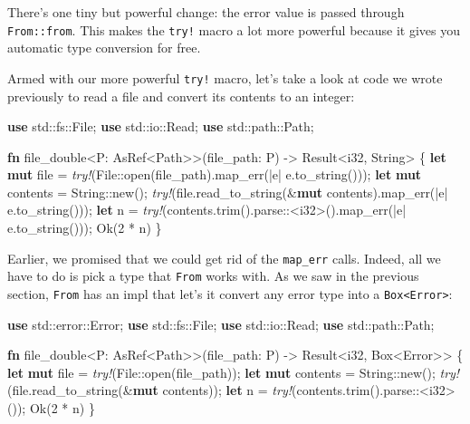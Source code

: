 \documentclass[a4paper,]{book}
\newenvironment{Shaded}{\begin{snugshade}}{\end{snugshade}}
\newcommand{\KeywordTok}[1]{\textcolor[rgb]{0.13,0.29,0.53}{\textbf{{#1}}}}
\newcommand{\DataTypeTok}[1]{\textcolor[rgb]{0.13,0.29,0.53}{{#1}}}
\newcommand{\DecValTok}[1]{\textcolor[rgb]{0.00,0.00,0.81}{{#1}}}
\newcommand{\ConstantTok}[1]{\textcolor[rgb]{0.00,0.00,0.00}{{#1}}}
\newcommand{\PreprocessorTok}[1]{\textcolor[rgb]{0.56,0.35,0.01}{\textit{{#1}}}}
\newcommand{\NormalTok}[1]{{#1}}
\begin{document}
There's one tiny but powerful change: the error value is passed through
\texttt{From::from}. This makes the \texttt{try!} macro a lot more
powerful because it gives you automatic type conversion for free.

Armed with our more powerful \texttt{try!} macro, let's take a look at
code we wrote previously to read a file and convert its contents to an
integer:

\begin{Shaded}
\begin{Highlighting}[]
\KeywordTok{use} \NormalTok{std::fs::File;}
\KeywordTok{use} \NormalTok{std::io::Read;}
\KeywordTok{use} \NormalTok{std::path::Path;}

\KeywordTok{fn} \NormalTok{file_double<P: AsRef<Path>>(file_path: P) -> }\DataTypeTok{Result}\NormalTok{<}\DataTypeTok{i32}\NormalTok{, }\DataTypeTok{String}\NormalTok{> \{}
    \KeywordTok{let} \KeywordTok{mut} \NormalTok{file = }\PreprocessorTok{try!}\NormalTok{(File::open(file_path).map_err(|e| e.to_string()));}
    \KeywordTok{let} \KeywordTok{mut} \NormalTok{contents = }\DataTypeTok{String}\NormalTok{::new();}
    \PreprocessorTok{try!}\NormalTok{(file.read_to_string(&}\KeywordTok{mut} \NormalTok{contents).map_err(|e| e.to_string()));}
    \KeywordTok{let} \NormalTok{n = }\PreprocessorTok{try!}\NormalTok{(contents.trim().parse::<}\DataTypeTok{i32}\NormalTok{>().map_err(|e| e.to_string()));}
    \ConstantTok{Ok}\NormalTok{(}\DecValTok{2} \NormalTok{* n)}
\NormalTok{\}}
\end{Highlighting}
\end{Shaded}

Earlier, we promised that we could get rid of the \texttt{map\_err}
calls. Indeed, all we have to do is pick a type that \texttt{From} works
with. As we saw in the previous section, \texttt{From} has an impl that
let's it convert any error type into a
\texttt{Box\textless{}Error\textgreater{}}:

\begin{Shaded}
\begin{Highlighting}[]
\KeywordTok{use} \NormalTok{std::error::Error;}
\KeywordTok{use} \NormalTok{std::fs::File;}
\KeywordTok{use} \NormalTok{std::io::Read;}
\KeywordTok{use} \NormalTok{std::path::Path;}

\KeywordTok{fn} \NormalTok{file_double<P: AsRef<Path>>(file_path: P) -> }\DataTypeTok{Result}\NormalTok{<}\DataTypeTok{i32}\NormalTok{, }\DataTypeTok{Box}\NormalTok{<Error>> \{}
    \KeywordTok{let} \KeywordTok{mut} \NormalTok{file = }\PreprocessorTok{try!}\NormalTok{(File::open(file_path));}
    \KeywordTok{let} \KeywordTok{mut} \NormalTok{contents = }\DataTypeTok{String}\NormalTok{::new();}
    \PreprocessorTok{try!}\NormalTok{(file.read_to_string(&}\KeywordTok{mut} \NormalTok{contents));}
    \KeywordTok{let} \NormalTok{n = }\PreprocessorTok{try!}\NormalTok{(contents.trim().parse::<}\DataTypeTok{i32}\NormalTok{>());}
    \ConstantTok{Ok}\NormalTok{(}\DecValTok{2} \NormalTok{* n)}
\NormalTok{\}}
\end{Highlighting}
\end{Shaded}
\end{document}
